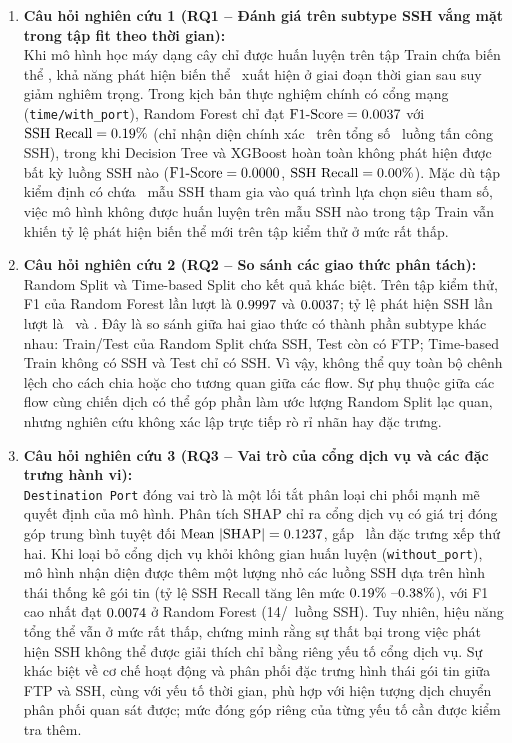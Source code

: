 \begin{enumerate}
    \item \textbf{Câu hỏi nghiên cứu 1 (RQ1 -- Đánh giá trên subtype SSH vắng mặt trong tập fit theo thời gian):}\\
    Khi mô hình học máy dạng cây chỉ được huấn luyện trên tập Train chứa biến thể \FTP, khả năng phát hiện biến thể \SSH\ xuất hiện ở giai đoạn thời gian sau suy giảm nghiêm trọng. Trong kịch bản thực nghiệm chính có cổng mạng (\texttt{time/with\_port}), Random Forest chỉ đạt $\text{F1-Score} = 0.0037$ với $\text{SSH Recall} = 0.19\%$ (chỉ nhận diện chính xác \RFTestTP\ trên tổng số \DataTestSSH\ luồng tấn công SSH), trong khi Decision Tree và XGBoost hoàn toàn không phát hiện được bất kỳ luồng SSH nào ($\text{F1-Score} = 0.0000$, $\text{SSH Recall} = 0.00\%$). Mặc dù tập kiểm định có chứa \DataValidationSSH\ mẫu SSH tham gia vào quá trình lựa chọn siêu tham số, việc mô hình không được huấn luyện trên mẫu SSH nào trong tập Train vẫn khiến tỷ lệ phát hiện biến thể mới trên tập kiểm thử ở mức rất thấp.

    \item \textbf{Câu hỏi nghiên cứu 2 (RQ2 -- So sánh các giao thức phân tách):}\\
    Random Split và Time-based Split cho kết quả khác biệt. Trên tập kiểm thử, F1 của Random Forest lần lượt là $0.9997$ và $0.0037$; tỷ lệ phát hiện SSH lần lượt là \RFRandomSSHRecall\ và \RFTestSSHRecall. Đây là so sánh giữa hai giao thức có thành phần subtype khác nhau: Train/Test của Random Split chứa SSH, Test còn có FTP; Time-based Train không có SSH và Test chỉ có SSH. Vì vậy, không thể quy toàn bộ chênh lệch cho cách chia hoặc cho tương quan giữa các flow. Sự phụ thuộc giữa các flow cùng chiến dịch có thể góp phần làm ước lượng Random Split lạc quan, nhưng nghiên cứu không xác lập trực tiếp rò rỉ nhãn hay đặc trưng.

    \item \textbf{Câu hỏi nghiên cứu 3 (RQ3 -- Vai trò của cổng dịch vụ và các đặc trưng hành vi):}\\
    \texttt{Destination Port} đóng vai trò là một lối tắt phân loại chi phối mạnh mẽ quyết định của mô hình. Phân tích SHAP chỉ ra cổng dịch vụ có giá trị đóng góp trung bình tuyệt đối $\text{Mean } |\text{SHAP}| = 0.1237$, gấp \SHAPRatioTopOneTwo\ lần đặc trưng xếp thứ hai. Khi loại bỏ cổng dịch vụ khỏi không gian huấn luyện (\texttt{without\_port}), mô hình nhận diện được thêm một lượng nhỏ các luồng SSH dựa trên hình thái thống kê gói tin (tỷ lệ SSH Recall tăng lên mức $0.19\%\ \text{--} 0.38\%$), với F1 cao nhất đạt $0.0074$ ở Random Forest (14/\DataTestSSH\ luồng SSH). Tuy nhiên, hiệu năng tổng thể vẫn ở mức rất thấp, chứng minh rằng sự thất bại trong việc phát hiện SSH không thể được giải thích chỉ bằng riêng yếu tố cổng dịch vụ. Sự khác biệt về cơ chế hoạt động và phân phối đặc trưng hình thái gói tin giữa FTP và SSH, cùng với yếu tố thời gian, phù hợp với hiện tượng dịch chuyển phân phối quan sát được; mức đóng góp riêng của từng yếu tố cần được kiểm tra thêm.


\end{enumerate}
